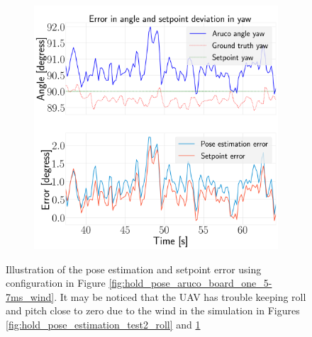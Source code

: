 \documentclass[../Head/report.tex]{subfiles}
\begin{document}
\begin{figure}[H]
\begin{subfigure}[t]{.30\textwidth}
        \caption{}
        \label{fig:hold_pose_estimation_test2_pitch}
    \end{subfigure}
     \hspace{0.2em}
    \begin{subfigure}[t]{.30\textwidth}
        \centering
        \includegraphics[width=\textwidth]{../Figures/hold_pose_using_aruco_pose_estimation/pose_error_yaw_test2.png}
        \caption{}
        \label{fig:hold_pose_estimation_test2_yaw}
    \end{subfigure}
    \caption{Illustration of the pose estimation and setpoint error using configuration in Figure \ref{fig:hold_pose_aruco_board_one_5-7ms_wind}. It may be noticed that the UAV has trouble keeping roll and pitch close to zero due to the wind in the simulation in Figures \ref{fig:hold_pose_estimation_test2_roll} and \ref{fig:hold_pose_estimation_test2_pitch}}
    \label{fig:hold_pose_estimation_test2_error_angle}
\end{figure}
\end{document}
